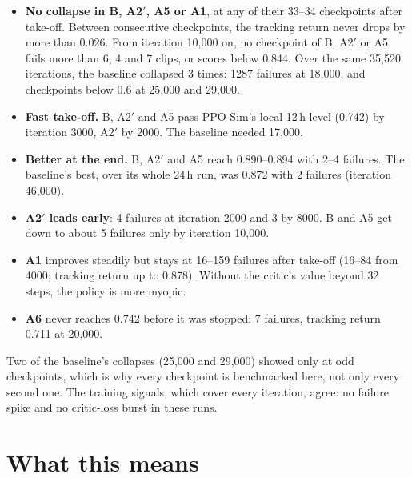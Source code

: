 \documentclass[10pt]{article}
\begin{document}
\begin{itemize}
  \item \textbf{No collapse in B, A2$'$, A5 or A1}, at any of their 33--34 checkpoints after take-off.
  Between consecutive checkpoints, the tracking return never drops by more than 0.026. From iteration
  10,000 on, no checkpoint of B, A2$'$ or A5 fails more than 6, 4 and 7 clips, or scores below 0.844.
  Over the same 35,520 iterations, the baseline collapsed 3 times: 1287 failures at 18,000, and
  checkpoints below 0.6 at 25,000 and 29,000.
  \item \textbf{Fast take-off.} B, A2$'$ and A5 pass PPO-Sim's local 12\,h level (0.742) by iteration
  3000, A2$'$ by 2000. The baseline needed 17,000.
  \item \textbf{Better at the end.} B, A2$'$ and A5 reach 0.890--0.894 with 2--4 failures. The
  baseline's best, over its whole 24\,h run, was 0.872 with 2 failures (iteration 46,000).
  \item \textbf{A2$'$ leads early}: 4 failures at iteration 2000 and 3 by 8000. B and A5 get down to
  about 5 failures only by iteration 10,000.
  \item \textbf{A1} improves steadily but stays at 16--159 failures after take-off (16--84 from 4000;
  tracking return up to 0.878). Without the critic's value beyond 32 steps, the policy is more myopic.
  \item \textbf{A6} never reaches 0.742 before it was stopped: 7 failures, tracking return 0.711 at
  20,000.
\end{itemize}

Two of the baseline's collapses (25,000 and 29,000) showed only at odd checkpoints, which is why every
checkpoint is benchmarked here, not only every second one. The training signals, which cover every
iteration, agree: no failure spike and no critic-loss burst in these runs.

\section{What this means}
\end{document}
